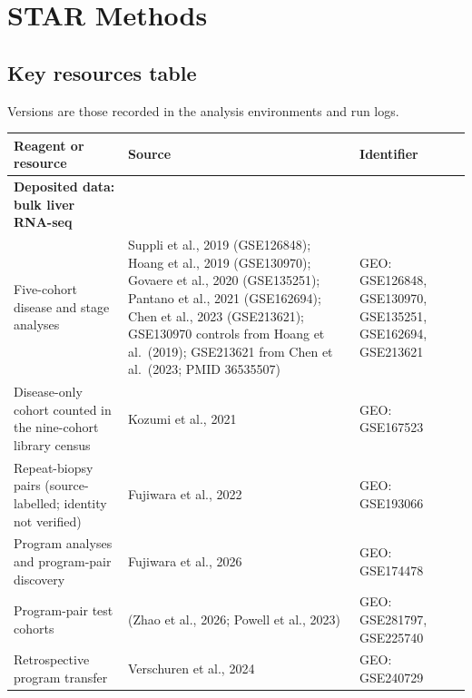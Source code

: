 \section{STAR Methods}\label{star-methods}

\subsection{Key resources table}\label{key-resources-table}

Versions are those recorded in the analysis environments and run logs.

\begin{longtable}[]{@{}
  >{\raggedright\arraybackslash}p{}
  >{\raggedright\arraybackslash}p{}
  >{\raggedright\arraybackslash}p{}@{}}
\toprule\noalign{}
\begin{minipage}[b]{\linewidth}\raggedright
Reagent or resource
\end{minipage} & \begin{minipage}[b]{\linewidth}\raggedright
Source
\end{minipage} & \begin{minipage}[b]{\linewidth}\raggedright
Identifier
\end{minipage} \\
\midrule\noalign{}
\endhead
\bottomrule\noalign{}
\endlastfoot
\textbf{Deposited data: bulk liver RNA-seq} & & \\
Five-cohort disease and stage analyses & Suppli et al., 2019 (GSE126848); Hoang et al., 2019 (GSE130970); Govaere et al., 2020 (GSE135251); Pantano et al., 2021 (GSE162694); Chen et al., 2023 (GSE213621); GSE130970 controls from Hoang et al.~(2019); GSE213621 from Chen et al.~(2023; PMID 36535507) & GEO: GSE126848, GSE130970, GSE135251, GSE162694, GSE213621 \\
Disease-only cohort counted in the nine-cohort library census & Kozumi et al., 2021 & GEO: GSE167523 \\
Repeat-biopsy pairs (source-labelled; identity not verified) & Fujiwara et al., 2022 & GEO: GSE193066 \\
Program analyses and program-pair discovery & Fujiwara et al., 2026 & GEO: GSE174478 \\
Program-pair test cohorts & (Zhao et al., 2026; Powell et al., 2023) & GEO: GSE281797, GSE225740 \\
Retrospective program transfer & Verschuren et al., 2024 & GEO: GSE240729 \\

\end{longtable}
